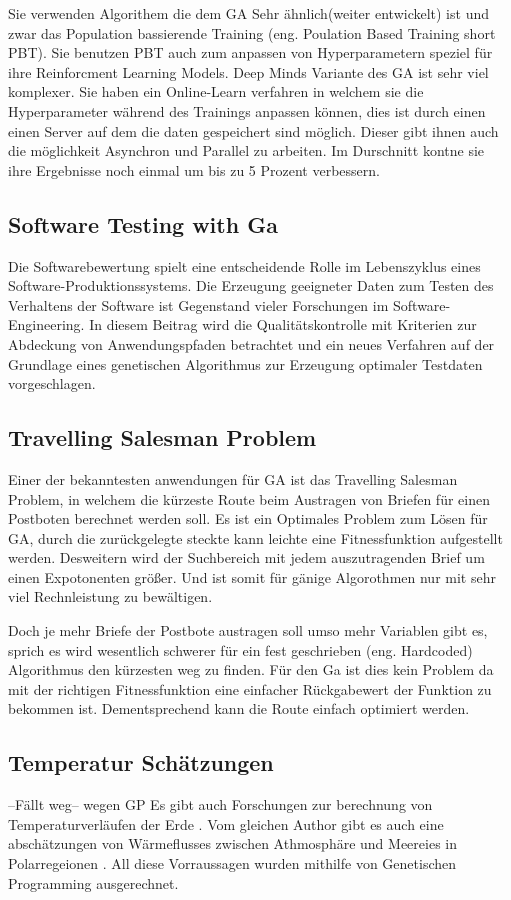 Sie verwenden Algorithem die dem GA Sehr ähnlich(weiter entwickelt) ist und zwar das Population bassierende Training (eng. Poulation Based Training short PBT). Sie benutzen PBT auch zum anpassen von Hyperparametern speziel für ihre Reinforcment Learning Models. Deep Minds Variante des GA ist sehr viel komplexer. 
Sie haben ein Online-Learn verfahren in welchem sie die Hyperparameter während des Trainings anpassen können, dies ist durch einen einen Server auf dem die daten gespeichert sind möglich. Dieser gibt ihnen auch die möglichkeit Asynchron und Parallel zu arbeiten. Im Durschnitt kontne sie ihre Ergebnisse noch einmal um bis zu 5 Prozent verbessern. 
\fi

\subsection{Software Testing with Ga}
Die Softwarebewertung spielt eine entscheidende Rolle im Lebenszyklus eines Software-Produktionssystems. Die Erzeugung geeigneter Daten zum Testen des Verhaltens der Software ist Gegenstand vieler Forschungen im Software-Engineering. In diesem Beitrag wird die Qualitätskontrolle mit Kriterien zur Abdeckung von Anwendungspfaden betrachtet und ein neues Verfahren auf der Grundlage eines genetischen Algorithmus zur Erzeugung optimaler Testdaten vorgeschlagen. 
\cite{Keshavarz}


\subsection{Travelling Salesman Problem}
Einer der bekanntesten anwendungen für GA ist das Travelling Salesman Problem, in welchem die kürzeste Route beim Austragen von Briefen für einen Postboten berechnet werden soll. Es ist ein Optimales Problem zum Lösen für GA, durch die zurückgelegte steckte kann leichte eine Fitnessfunktion aufgestellt werden. Desweitern wird der Suchbereich mit jedem auszutragenden Brief um einen Expotonenten größer. Und ist somit für gänige Algorothmen nur mit sehr viel Rechnleistung zu bewältigen.

 Doch je mehr Briefe der Postbote austragen soll umso mehr Variablen gibt es, sprich es wird wesentlich schwerer für ein fest geschrieben (eng. Hardcoded) Algorithmus den kürzesten weg zu finden. Für den Ga ist dies kein Problem da mit der richtigen Fitnessfunktion eine einfacher Rückgabewert der Funktion zu bekommen ist. Dementsprechend kann die Route einfach optimiert werden.

\subsection{Temperatur Schätzungen}
--Fällt weg-- wegen GP 
Es gibt auch Forschungen zur berechnung von Temperaturverläufen der Erde \cite{Stanislawska1}. Vom gleichen Author gibt es auch eine abschätzungen von Wärmeflusses zwischen Athmosphäre und Meereies in Polarregeionen \cite{Stanislawska,2}. All diese Vorraussagen wurden mithilfe von Genetischen Programming ausgerechnet. 

